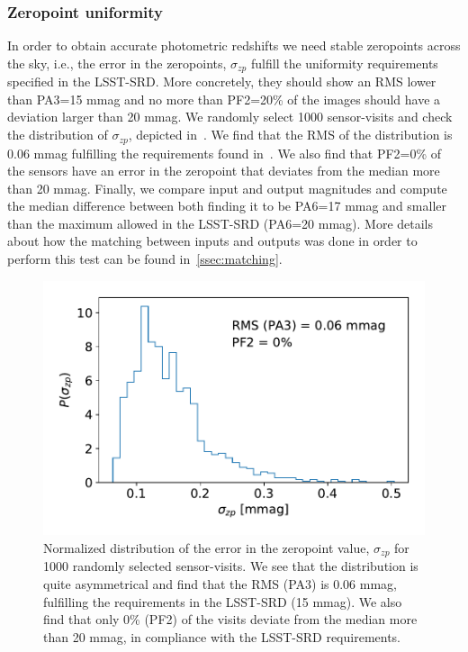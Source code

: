 \documentclass[twocolumn]{aastex62}
\begin{document}
\subsubsection{Zeropoint uniformity}
\label{sssec:zeropoints}
In order to obtain accurate photometric redshifts we need stable zeropoints across the sky, i.e., the error in the zeropoints, $\sigma_{zp}$ fulfill the uniformity requirements specified in the LSST-SRD. More concretely, they should show an RMS lower than PA3=15 mmag and no more than PF2=20\% of the images should have a deviation larger than 20 mmag. We randomly select 1000 sensor-visits and check the distribution of $\sigma_{zp}$, depicted in~. We find that the RMS of the distribution is 0.06 mmag fulfilling the requirements found in~\citep{LPM-17}. We also find that PF2=0\% of the sensors have an error in the zeropoint that deviates from the median more than 20 mmag. Finally, we compare input and output magnitudes and compute the median difference between both finding it to be PA6=17 mmag and smaller than the maximum allowed in the LSST-SRD (PA6=20 mmag). More details about how the matching between inputs and outputs was done in order to perform this test can be found in~\ref{ssec:matching}.

\begin{figure}
\centering
\includegraphics[width=0.9\columnwidth]{PA234.pdf}
\caption{Normalized distribution of the error in the zeropoint value, $\sigma_{zp}$ for 1000 randomly selected sensor-visits. We see that the distribution is quite asymmetrical and find that the RMS (PA3) is 0.06 mmag, fulfilling the requirements in the LSST-SRD (15 mmag). We also find that only 0\% (PF2) of the visits deviate from the median more than 20 mmag, in compliance with the LSST-SRD requirements.}
\label{fig:PA34}
\end{figure}
\end{document}
